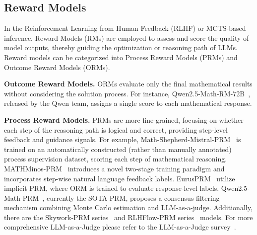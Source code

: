 \subsection{Reward Models}
In the Reinforcement Learning from Human Feedback (RLHF) or MCTS-based inference, Reward Models (RMs) are employed to assess and score the quality of model outputs, thereby guiding the optimization or reasoning path of LLMs. Reward models can be categorized into Process Reward Models (PRMs) and Outcome Reward Models (ORMs).

\textbf{Outcome Reward Models.} ORMs evaluate only the final mathematical results without considering the solution process. For instance, Qwen2.5-Math-RM-72B~\cite{zhang2025lessons}, released by the Qwen team, assigns a single score to each mathematical response.

\textbf{Process Reward Models.} PRMs are more fine-grained, focusing on whether each step of the reasoning path is logical and correct, providing step-level feedback and guidance signals. For example, Math-Shepherd-Mistral-PRM~\cite{wang2024math} is trained on an automatically constructed (rather than manually annotated) process supervision dataset, scoring each step of mathematical reasoning. MATHMinos-PRM~\cite{gao2024llm} introduces a novel two-stage training paradigm and incorporates step-wise natural language feedback labels. EurusPRM~\cite{cui2025process} utilize implicit PRM, where ORM is trained to evaluate response-level labels. Qwen2.5-Math-PRM~\cite{zhang2025lessons}, currently the SOTA PRM, proposes a consensus filtering mechanism combining Monte Carlo estimation and LLM-as-a-judge. Additionally, there are the Skywork-PRM series~\cite{skyworkopeno12024} and RLHFlow-PRM series~\cite{wei2024implementation} models. For more comprehensive LLM-as-a-Judge please refer to the LLM-as-a-Judge survey~\cite{gu2024survey}.